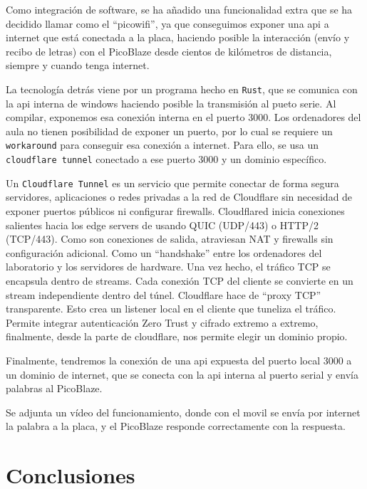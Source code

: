 \documentclass[a4paper, 12pt]{report}
\begin{document}
Como integración de software, se ha añadido una funcionalidad extra que se ha decidido llamar como el ``picowifi'', ya que conseguimos exponer una api a internet que está conectada a la placa, haciendo posible la interacción (envío y recibo de letras) con el PicoBlaze desde cientos de kilómetros de distancia, siempre y cuando tenga internet.

La tecnología detrás viene por un programa hecho en \texttt{Rust}, que se comunica con la api interna de windows haciendo posible la transmisión al pueto serie. Al compilar, exponemos esa conexión interna en el puerto 3000. Los ordenadores del aula no tienen posibilidad de exponer un puerto, por lo cual se requiere un \texttt{workaround} para conseguir esa conexión a internet. Para ello, se usa un \texttt{cloudflare tunnel} conectado a ese puerto 3000 y un dominio específico.

Un \texttt{Cloudflare Tunnel} es un servicio que permite conectar de forma segura servidores, aplicaciones o redes privadas a la red de Cloudflare sin necesidad de exponer puertos públicos ni configurar firewalls. Cloudflared inicia conexiones salientes hacia los edge servers de usando QUIC (UDP/443) o HTTP/2 (TCP/443). Como son conexiones de salida, atraviesan NAT y firewalls sin configuración adicional. Como un ``handshake'' entre los ordenadores del laboratorio y los servidores de hardware. Una vez hecho, el tráfico TCP se encapsula dentro de streams. Cada conexión TCP del cliente se convierte en un stream independiente dentro del túnel. Cloudflare hace de ``proxy TCP'' transparente. Esto crea un listener local en el cliente que tuneliza el tráfico. Permite integrar autenticación Zero Trust y cifrado extremo a extremo, finalmente, desde la parte de cloudflare, nos permite elegir un dominio propio. 

Finalmente, tendremos la conexión de una api expuesta del puerto local 3000 a un dominio de internet, que se conecta con la api interna al puerto serial y envía palabras al PicoBlaze.

Se adjunta un vídeo del funcionamiento, donde con el movil se envía por internet la palabra a la placa, y el PicoBlaze responde correctamente con la respuesta.

\chapter{Conclusiones}
\end{document}
